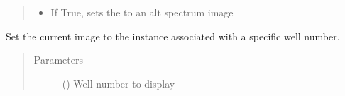 \documentclass[letterpaper,10pt,english]{sphinxmanual}
\begin{document}
\begin{fulllineitems}
\begin{fulllineitems}
\begin{quote}
\begin{description}
\begin{itemize}
\item {} 
 \textendash{} If True, sets the 
to an alt spectrum image

\end{itemize}

\end{description}\end{quote}

\end{fulllineitems}


\begin{fulllineitems}
\label{\detokenize{polo.widgets:polo.widgets.slideshow_viewer.SlideshowViewer.set_current_image_by_well_number}}
Set the current image to the {\hyperref[\detokenize{polo.crystallography:polo.crystallography.image.Image}]{}} instance associated with a
specific well number.
\begin{quote}\begin{description}
\item[{Parameters}] \leavevmode
{} () \textendash{} Well number to display

\end{description}\end{quote}

\end{fulllineitems}



\end{fulllineitems}
\end{document}
